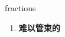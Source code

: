
\begin{frame}
{\huge fractious}
\begin{center}
\begin{enumerate}\Large
  \item \textbf{难以管束的}
\end{enumerate}
\end{center}
\end{frame}
